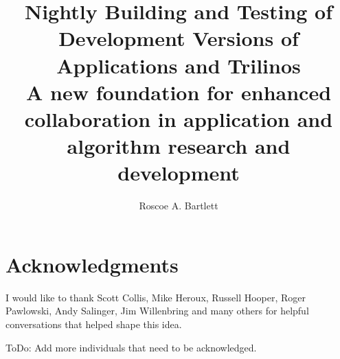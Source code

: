 \documentclass[pdf,ps2pdf,11pt]{SANDreport}
\title{\center
Nightly Building and Testing of Development Versions of Applications and
Trilinos\\[2ex] {\Large A new foundation for enhanced collaboration in
application and algorithm research and development}}
\author{Roscoe A. Bartlett}
\begin{document}
\maketitle

%


%
%


%
%

%
\clearpage
\section*{Acknowledgments}

I would like to thank Scott Collis, Mike Heroux, Russell Hooper, Roger
Pawlowski, Andy Salinger, Jim Willenbring and many others for helpful
conversations that helped shape this idea.

ToDo: Add more individuals that need to be acknowledged.

%

%
\clearpage
\tableofcontents

\end{document}

